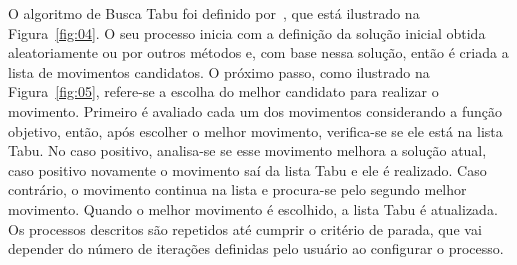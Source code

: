 O algoritmo de Busca Tabu foi definido por~\cite{glover1990tabu}, que está ilustrado na Figura~\ref{fig:04}. O seu processo inicia com a definição da solução inicial obtida aleatoriamente ou por outros métodos e, com base nessa solução, então é criada a lista de movimentos candidatos. O próximo passo, como ilustrado na Figura~\ref{fig:05}, refere-se a escolha do melhor candidato para realizar o movimento. Primeiro é avaliado cada um dos movimentos considerando a função objetivo, então, após escolher o melhor movimento, verifica-se se ele está na lista Tabu. No caso positivo, analisa-se se esse movimento melhora a solução atual, caso positivo novamente o movimento saí da lista Tabu e ele é realizado. Caso contrário, o movimento continua na lista e procura-se pelo segundo melhor movimento. Quando o melhor movimento é escolhido, a lista Tabu é atualizada. Os processos descritos são repetidos até cumprir o critério de parada, que vai depender do número de iterações definidas pelo usuário ao configurar o processo.
